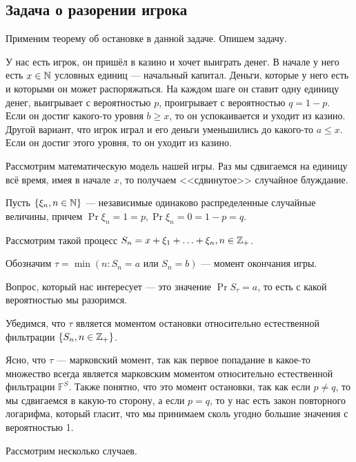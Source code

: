 \subsection{Задача о разорении игрока}

Применим теорему об остановке в данной задаче. Опишем задачу.

У нас есть игрок, он пришёл в казино и хочет выиграть денег. В начале у него
есть $x \in \mathbb{N}$ условных единиц --- начальный капитал. Деньги, которые у него есть
и которыми он может распоряжаться. На каждом шаге он ставит одну единицу денег,
выигрывает с вероятностью $p$, проигрывает с вероятностью $q = 1 - p$. Если
он достиг какого-то уровня $b \geq x$, то он успокаивается и уходит из казино.
Другой вариант, что игрок играл и его деньги уменьшились до какого-то $a \leq x$.
Если он достиг этого уровня, то он уходит из казино.

Рассмотрим математическую модель нашей игры. Раз мы сдвигаемся на единицу всё время,
имея в начале $x$, то получаем <<сдвинутое>> случайное блуждание.

Пусть $\{\xi_n, n \in \mathbb{N}\}$ --- независимые одинаково распределенные
случайные величины, причем $\Pr{\xi_n = 1} = p, \Pr{\xi_n = 0} = 1 - p = q$.

Рассмотрим такой процесс $S_n = x + \xi_1 + \ldots + \xi_n, n \in \mathbb{Z}_+$.

Обозначим $\tau = \min(n : S_n = a \text{ или } S_n = b)$ --- момент окончания
игры.

Вопрос, который нас интересует --- это значение $\Pr{S_\tau = a}$, то есть с какой
вероятностью мы разоримся.

Убедимся, что $\tau$ является моментом остановки относительно естественной фильтрации
$\{S_n, n \in \mathbb{Z}_+\}$. 

Ясно, что $\tau$ --- марковский момент, так как первое попадание в какое-то множество
всегда является марковским моментом относительно естественной фильтрации $\mathbb{F}^S$.
Также понятно, что это момент остановки, так как если $p \neq q$, то мы сдвигаемся
в какую-то сторону, а если $p = q$, то у нас есть закон повторного логарифма,
который гласит, что мы принимаем сколь угодно большие значения с вероятностью 1.

Рассмотрим несколько случаев.


